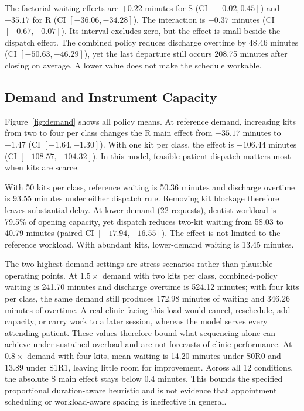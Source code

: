 \documentclass[conference]{IEEEtran}
\begin{document}
The factorial waiting effects are $+0.22$ minutes for S (CI $[-0.02,0.45]$) and $-35.17$ for R (CI $[-36.06,-34.28]$). The interaction is $-0.37$ minutes (CI $[-0.67,-0.07]$). Its interval excludes zero, but the effect is small beside the dispatch effect. The combined policy reduces discharge overtime by 48.46 minutes (CI $[-50.63,-46.29]$), yet the last departure still occurs 208.75 minutes after closing on average. A lower value does not make the schedule workable.

\subsection{Demand and Instrument Capacity}\label{subsec:demand}
Figure~\ref{fig:demand} shows all policy means. At reference demand, increasing kits from two to four per class changes the R main effect from $-35.17$ minutes to $-1.47$ (CI $[-1.64,-1.30]$). With one kit per class, the effect is $-106.44$ minutes (CI $[-108.57,-104.32]$). In this model, feasible-patient dispatch matters most when kits are scarce.

With 50 kits per class, reference waiting is 50.36 minutes and discharge overtime is 93.55 minutes under either dispatch rule. Removing kit blockage therefore leaves substantial delay. At lower demand (22 requests), dentist workload is 79.5\% of opening capacity, yet dispatch reduces two-kit waiting from 58.03 to 40.79 minutes (paired CI $[-17.94,-16.55]$). The effect is not limited to the reference workload. With abundant kits, lower-demand waiting is 13.45 minutes.

The two highest demand settings are stress scenarios rather than plausible operating points. At $1.5\times$ demand with two kits per class, combined-policy waiting is 241.70 minutes and discharge overtime is 524.12 minutes; with four kits per class, the same demand still produces 172.98 minutes of waiting and 346.26 minutes of overtime. A real clinic facing this load would cancel, reschedule, add capacity, or carry work to a later session, whereas the model serves every attending patient. These values therefore bound what sequencing alone can achieve under sustained overload and are not forecasts of clinic performance. At $0.8\times$ demand with four kits, mean waiting is 14.20 minutes under S0R0 and 13.89 under S1R1, leaving little room for improvement. Across all 12 conditions, the absolute S main effect stays below 0.4 minutes. This bounds the specified proportional duration-aware heuristic and is not evidence that appointment scheduling or workload-aware spacing is ineffective in general.
\end{document}
